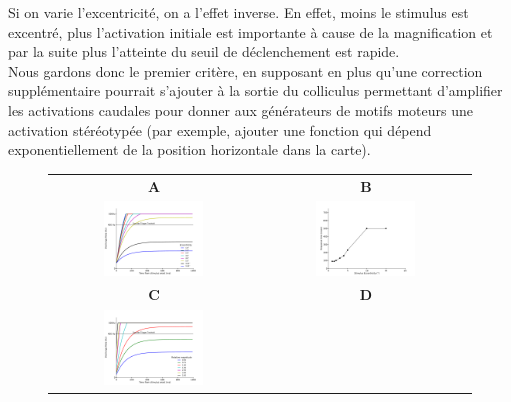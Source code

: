 Si on varie l'excentricité, on a l'effet inverse. En effet, moins le stimulus est excentré, plus l'activation initiale est importante à cause de la magnification et par la suite plus l'atteinte du seuil de déclenchement est rapide.\\ 

Nous gardons donc le premier critère, en supposant en plus qu'une correction supplémentaire pourrait s'ajouter à la sortie du colliculus permettant d'amplifier les activations caudales pour donner aux générateurs de motifs moteurs une activation stéréotypée (par exemple, ajouter une fonction qui dépend exponentiellement de la position horizontale dans la carte).






\begin{figure}
  \begin{center}
    \begin{tabular}[t]{cc}
     {\textsf {\textbf A}} &
      {\textsf {\textbf B}} \\
      \includegraphics[width=0.5\textwidth]{figures/ch3_7_RT-eccentricity-A} &
      \includegraphics[width=0.5\textwidth]{figures/ch3_7_RT-eccentricity-B} \\
      {\textsf {\textbf C}} &
      {\textsf {\textbf D}} \\     
      \includegraphics[width=0.5\textwidth]{figures/ch3_7_RT-size-A} &

\end{tabular}
\end{center}
\end{figure}
